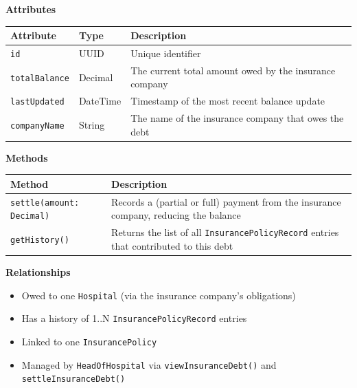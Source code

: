 \documentclass[12pt, a4paper]{article}
\begin{document}
\textbf{Attributes}

\begin{center}
\small
\renewcommand{\arraystretch}{1.35}
\begin{tabularx}{\textwidth}{|>{\raggedright\arraybackslash}p{3.4cm}|>{\raggedright\arraybackslash}p{3.3cm}|Y|}
\hline
{}
\textbf{Attribute} & \textbf{Type} & \textbf{Description} \\ \hline
\texttt{id} & UUID & Unique identifier \\ \hline
\texttt{totalBalance} & Decimal & The current total amount owed by the insurance company \\ \hline
\texttt{lastUpdated} & DateTime & Timestamp of the most recent balance update \\ \hline
\texttt{companyName} & String & The name of the insurance company that owes the debt \\ \hline
\end{tabularx}
\end{center}

\textbf{Methods}

\begin{center}
\small
\renewcommand{\arraystretch}{1.35}
\begin{tabularx}{\textwidth}{|M|Y|}
\hline
{}
\textbf{Method} & \textbf{Description} \\ \hline
\texttt{settle(amount: Decimal)} & Records a (partial or full) payment from the insurance company, reducing the balance \\ \hline
\texttt{getHistory()} & Returns the list of all \texttt{InsurancePolicyRecord} entries that contributed to this debt \\ \hline
\end{tabularx}
\end{center}

\textbf{Relationships}

\begin{itemize}
    \item Owed to one \texttt{Hospital} (via the insurance company's obligations)
    \item Has a history of 1..N \texttt{InsurancePolicyRecord} entries
    \item Linked to one \texttt{InsurancePolicy}
    \item Managed by \texttt{HeadOfHospital} via \texttt{viewInsuranceDebt()} and \texttt{settleInsuranceDebt()}
\end{itemize}
\end{document}
